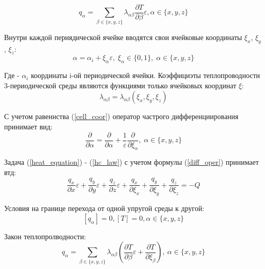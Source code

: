 \begin{equation}
    q_{\alpha} = \sum_{\beta \in \{x,y,z\}}\lambda_{\alpha\beta} \frac{\partial T}{\partial \beta}\varepsilon, \alpha \in \{x,y,z\}
\end{equation}

Внутри каждой периядической ячейке вводятся свои ячейковые координаты 
$\xi_x$, $\xi_y$, $\xi_z$:
\begin{equation}
    \label{cell_coor}
    \alpha=\alpha_i + \xi_{\alpha}\varepsilon, \; \xi_{\alpha} \in \{0,1\}, \; \alpha \in \{x,y,z\}
\end{equation}

Где - 
$\alpha_i$ 
координаты i-ой периодической ячейки. Коэффициэты теплопроводности 3-периодической среды являются функциями только ячейковых координат 
$\xi$:
\begin{equation}
    \lambda_{\alpha \beta} = \lambda_{\alpha \beta}(\xi_x, \xi_y, \xi_z)
\end{equation}

С учетом равеннства 
(\ref{cell_coor}) 
оператор частрого дифференциирования принимает вид:
\begin{equation}
    \label{diff_oper}
    \frac{\partial}{\partial \alpha}=\frac{\partial}{\partial \alpha} + \frac{1}{\varepsilon}\frac{\partial}{\partial \xi_{\alpha}}, \; \alpha \in \{x,y,z\}
\end{equation}

Задача 
(\ref{heat_equation})
-
(\ref{hc_law})
с учетом формулы 
(\ref{diff_oper})
принимает втд:
\begin{equation}
    \label{heat_equation_epsilon}
    \frac{q_x}{\partial x}\varepsilon+
    \frac{q_y}{\partial y}\varepsilon+
    \frac{q_z}{\partial z}\varepsilon+
    \frac{q_x}{\partial \xi_x}+
    \frac{q_y}{\partial \xi_y}+
    \frac{q_z}{\partial \xi_z}=
    -Q
\end{equation}

Условия на границе перехода от одной упругой среды к другой:
\begin{equation}
    \left[ q_\alpha \right] = 0, \left[ T \right] = 0, \alpha \in \{ x,y,z \}
\end{equation}

Закон теплопролводности:
\begin{equation}
    \label{hc_law_epsilon}
    q_{\alpha}=\sum_{\beta \in \{x,y,z\}}\lambda_{\alpha \beta}\left(\frac{\partial T}{\partial \beta}\varepsilon+\frac{\partial T}{\partial \xi_{\beta}}\right), \:
    \alpha \in \{x,y,z\}
\end{equation}

